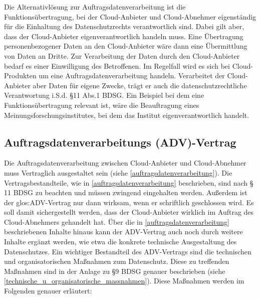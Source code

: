 Die Alternativl\"osung zur Auftragsdatenverarbeitung ist die Funktions\"ubertragung, bei der Cloud-Anbieter und Cloud-Abnehmer eigenst\"andig f\"ur die Einhaltung des Datenschutzrechts verantwortlich sind. Dabei gilt aber, dass der Cloud-Anbieter eigenverantwortlich handeln muss. Eine \"Ubertragung personenbezogener Daten an den Cloud-Anbieter w\"are dann eine \"Ubermittlung von Daten an Dritte. Zur Verarbeitung der Daten durch den Cloud-Anbieter bedarf es einer Einwilligung des Betroffenen.\newline 
Im Regelfall wird es sich bei Cloud-Produkten um eine Auftragsdatenverarbeitung handeln. Verarbeitet der Cloud-Anbieter aber Daten f\"ur eigene Zwecke, tr\"agt er auch die datenschutzrechtliche Verantwortung i.S.d. §11 Abs.1 BDSG. Ein Beispiel bei dem eine Funktions\"ubertragung relevant ist, w\"are die Beauftragung eines Meinungsforschungsinstitutes, bei dem das Institut eigenverantwortlich handelt. 
 \subsection{Auftragsdatenverarbeitungs (ADV)-Vertrag}
Die Auftragsdatenverarbeitung zwischen Cloud-Anbieter und Cloud-Abnehmer muss Vertraglich ausgestaltet sein (siehe \vref{auftragsdatenverarbeitung}). Die Vertragsbestandteile, wie in \vref{auftragsdatenverarbeitung} beschrieben, sind nach § 11 BDSG zu beachten und m\"ussen zwingend eingehalten werden.\newline
Au{\ss}erdem ist der \gls{glos:ADV}-Vertrag nur dann wirksam, wenn er schriftlich geschlossen wird. Es soll damit sichergestellt werden, dass der Cloud-Anbieter wirklich im Auftrag des Cloud-Abnehmers gehandelt hat. \"Uber die in \vref{auftragsdatenverarbeitung} beschriebenen Inhalte hinaus kann der ADV-Vertrag auch noch durch weitere Inhalte erg\"anzt werden, wie etwa die konkrete technische Ausgestaltung des Datenschutzes.\newline
Ein wichtiger Bestandteil des ADV-Vertrags sind die technischen und organisatorischen Ma{\ss}nahmen zum Datenschutz. Diese zu treffenden Ma{\ss}nahmen sind in der Anlage zu §9 BDSG genauer beschrieben (siehe \vref{technische_u_organisatorische_massnahmen}).  Diese Ma{\ss}nahmen werden im Folgenden genauer erl\"autert: 

